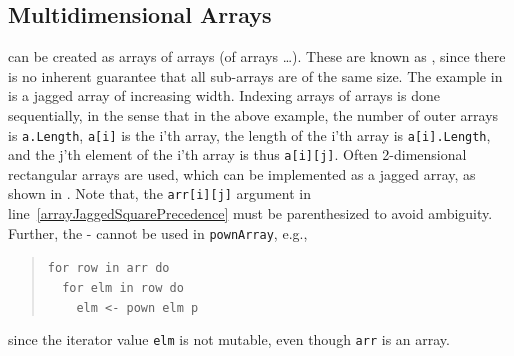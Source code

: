 \documentclass[fsharpNotes.tex]{subfiles}
\begin{document}
\subsection{Multidimensional Arrays}
 can be created as arrays of arrays (of arrays \dots). These are known as , since there is no inherent guarantee that all sub-arrays are of the same size. The example in  is a jagged array of increasing width.
%
%
Indexing arrays of arrays is done sequentially, in the sense that in the above example, the number of outer arrays is \lstinline|a.Length|,  \lstinline|a[i]| is the i'th array, the length of the i'th array is \lstinline|a[i].Length|, and the j'th element of the i'th array is thus \lstinline|a[i][j]|. Often 2-dimensional rectangular arrays are used, which can be implemented as a jagged array, as shown in .
%
%
Note that, the \lstinline{arr[i][j]} argument in line~\ref{arrayJaggedSquarePrecedence} must be parenthesized to avoid ambiguity. Further, the - cannot be used in \lstinline!pownArray!, e.g., 
\begin{quote} 
  \lstinline{for row in arr do}\\
  \lstinline{  for elm in row do}\\
  \lstinline{    elm <- pown elm p}
 \end{quote}
since the iterator value \lstinline!elm! is not mutable, even though \lstinline!arr! is an array.
\end{document}
